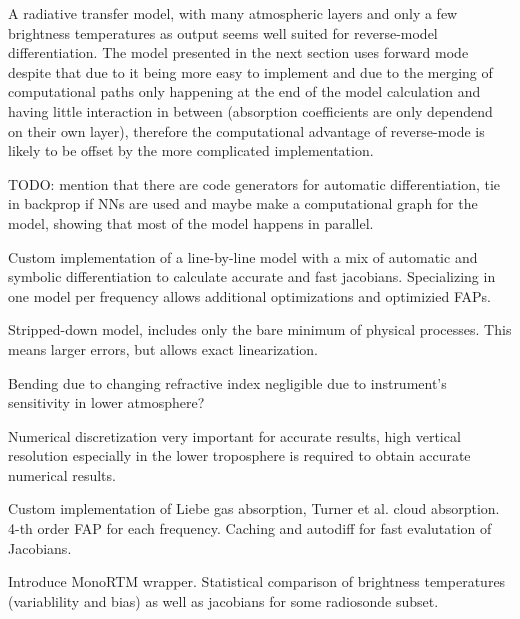         A radiative transfer model, with many atmospheric layers and only
        a few brightness temperatures as output seems well suited for
        reverse-model differentiation. The model presented in the next section
        uses forward mode despite that due to it being more easy to implement
        and due to the merging of computational paths only happening at the end
        of the model calculation and having little interaction in between
        (absorption coefficients are only dependend on their own layer),
        therefore the computational advantage of reverse-mode is likely to be
        offset by the more complicated implementation.

        TODO: mention that there are code generators for automatic
        differentiation, tie in backprop if NNs are used and maybe make a
        computational graph for the model, showing that most of the model
        happens in parallel.

    \stopsubsection

\stopsection


\startsection[title=A Numerical Model]

    Custom implementation of a line-by-line model with a mix of automatic and
    symbolic differentiation to calculate accurate and fast jacobians.
    Specializing in one model per frequency allows additional optimizations
    and optimizied FAPs.

    Stripped-down model, includes only the bare minimum of physical processes.
    This means larger errors, but allows exact linearization.

    Bending due to changing refractive index negligible due to instrument's
    sensitivity in lower atmosphere?

    Numerical discretization very important for accurate results, high vertical
    resolution especially in the lower troposphere is required to obtain
    accurate numerical results.

    \startsubsection[title=Implementation]

        Custom implementation of Liebe gas absorption, Turner et al. cloud
        absorption. 4-th order FAP for each frequency. Caching and autodiff
        for fast evalutation of Jacobians.

    \stopsubsection

    \startsubsection[title=Comparison with MonoRTM]

        Introduce MonoRTM wrapper. Statistical comparison of brightness
        temperatures (variablility and bias) as well as jacobians for some
        radiosonde subset.

